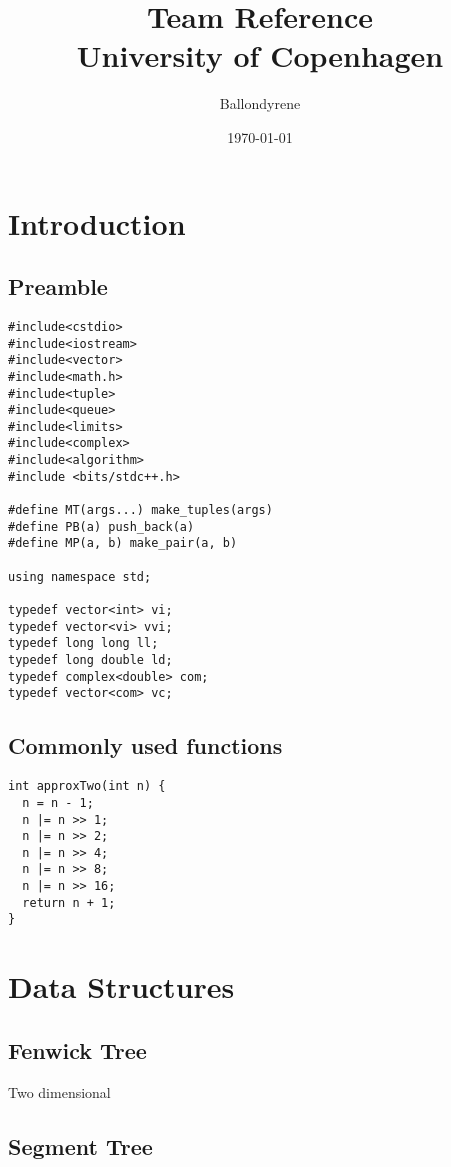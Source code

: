 \documentclass[a4paper,11pt]{article}
\title{Team Reference\\
       University of Copenhagen}
\author{Ballondyrene}
\date{\today}
\begin{document}
\maketitle
\thispagestyle{fancy}
\tableofcontents

\section{Introduction}
  \subsection{Preamble}
\begin{lstlisting}
#include<cstdio>
#include<iostream>
#include<vector>
#include<math.h>
#include<tuple>
#include<queue>
#include<limits>
#include<complex>
#include<algorithm>
#include <bits/stdc++.h>

#define MT(args...) make_tuples(args)
#define PB(a) push_back(a)
#define MP(a, b) make_pair(a, b)

using namespace std;

typedef vector<int> vi;
typedef vector<vi> vvi;
typedef long long ll;
typedef long double ld;
typedef complex<double> com;
typedef vector<com> vc;
\end{lstlisting}
  
  \subsection{Commonly used functions}
\begin{lstlisting}
int approxTwo(int n) {
  n = n - 1;
  n |= n >> 1;
  n |= n >> 2;
  n |= n >> 4;
  n |= n >> 8;
  n |= n >> 16;
  return n + 1;
}
\end{lstlisting}

\section{Data Structures}
  \subsection{Fenwick Tree}
    
    Two dimensional
    
  
  \subsection{Segment Tree}
        
    
\end{document}
